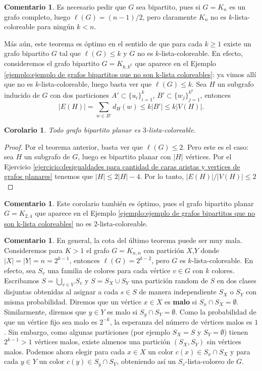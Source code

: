 \documentclass[12pt]{report}
\theoremstyle{plain}
\newtheorem{corollary}[theorem]{Corolario}
\theoremstyle{definition}
\newtheorem{remark}[theorem]{Comentario}
\newcommand{\abs}[1]{\left \vert #1 \right \vert}
\begin{document}
\begin{remark}
Es necesario pedir que $G$ sea bipartito, pues si $G = K_n$ es un grafo completo, luego $\ell (G) = (n-1)/2$, pero claramente $K_n$ no es $k$-lista-coloreable para ningún $k < n$.

Más aún, este teorema es óptimo en el sentido de que para cada $k \geq 1$ existe un grafo bipartito $G$ tal que $\ell (G) \leq k$ y $G$ no es $k$-lista-coloreable. En efecto, consideremos el grafo bipartito $G = K_{k,k^k}$ que aparece en el Ejemplo \ref{ejemplo:ejemplo de grafos bipartitos que no son k-lista coloreables}: ya vimos allí que no es $k$-lista-coloreable, luego basta ver que $\ell (G) \leq k$. Sea $H$ un subgrafo inducido de $G$ con dos particiones $A' \subset \{u_i\}_{i = 1}^k$, $B' \subset \{w_j\}_{j = 1}^{k^k}$, entonces
\[
    \abs{E(H)} = \sum_{w \in B'} d_H (w) \leq k \abs{ B'} \leq k \abs{V(H)}.
\]
\end{remark}

\begin{corollary}
Todo grafo bipartito planar es $3$-lista-coloreable.
\end{corollary}
\begin{proof}
Por el teorema anterior, basta ver que $\ell (G) \leq 2$. Pero este es el caso: sea $H$ un subgrafo de $G$, luego es bipartito planar con $\abs H$ vértices. Por el Ejercicio \ref{ejercicio:desigualdades para cantidad de caras aristas y vertices de grafos planares} tenemos que $\abs{H} \leq 2 \abs H - 4$. Por lo tanto, $\abs{E(H)} / \abs{V(H)} \leq 2$
\end{proof}

\begin{remark}
Este corolario también es óptimo, pues el grafo bipartito planar $G = K_{2,4}$ que aparece en el Ejemplo \ref{ejemplo:ejemplo de grafos bipartitos que no son k-lista coloreables} no es $2$-lista-coloreable.
\end{remark}

\begin{remark}
En general, la cota del último teorema puede ser muy mala. Consideremos para $K > 1$ el grafo $G = K_{n,n}$ con partición $X$,$Y$ donde $\abs X = \abs Y = n = 2^{k-1}$, entonces $\ell (G) = 2^{k-2}$, pero $G$ es $k$-lista-coloreable. En efecto, sea $S_v$ una familia de colores para cada vértice $v \in G$ con $k$ colores. Escribamos $S = \bigcup_{v \in V} S_v$ y $S = S_X \cup S_Y$ una partición random de $S$ en dos clases disjuntas obtenidas al asignar a cada $s \in S$ de manera independiente $S_X$ o $S_Y$ con misma probabilidad. Diremos que un vértice $x \in X$ es \textbf{malo} si $S_x \cap S_X = \emptyset$. Similarmente, diremos que $y \in Y$ es malo si $ S_y \cap S_Y = \emptyset$. Como la probabilidad de que un vértice fijo sea malo es $2^{-k}$, la esperanza del número de vértices malos es $1$. Sin embargo, como algunas particiones (por ejemplo $S_X = S$ y $S_Y = \emptyset$) tienen $2^{k-1} > 1$ vértices malos, existe almenos una partición $(S_X, S_Y)$ sin vértices malos. Podemos ahora elegir para cada $x \in X$ un color $c(x) \in S_x \cap S_X$ y para cada $y \in Y$ un color $c(y) \in S_y \cap S_Y$, obteniendo así un $S_v$-lista-coloreo de $G$.
\end{remark}
\end{document}
